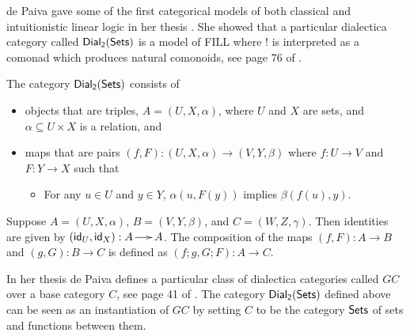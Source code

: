 de Paiva gave some of the first categorical models of both classical
and intuitionistic linear logic in her thesis \cite{dePaiva:1988}. She
showed that a particular dialectica category called $\mathsf{Dial_2}(\mathsf{Sets})$ is a model
of FILL where $!$ is interpreted as a comonad which produces natural
comonoids, see page 76 of \cite{dePaiva:1988}.
\begin{definition}
  \label{def:dial2sets}
  The category $\mathsf{Dial_2}(\mathsf{Sets})$ consists of 
  \begin{itemize}
  \item objects that are triples, $A = (U,X,\alpha)$, where $U$ and
    $X$ are sets, and $\alpha \subseteq U \times X$ is a relation, and
  \item maps that are pairs $(f,F) : (U,X,\alpha) \to (V,Y,\beta)$
    where $f : U \to V$ and $F : Y \to X$ such that
    \begin{itemize}
    \item For any $u \in U$ and $y \in Y$, $\alpha(u,F(y))$ implies $\beta(f(u),y)$.
    \end{itemize}
  \end{itemize}
  Suppose $A = (U,X,\alpha)$, $B = (V,Y,\beta)$, and
  $C = (W,Z,\gamma)$.  Then identities are given by
  $(\mathsf{id}_U,\mathsf{id}_X) : A \to A$.  The composition of the maps
  $(f,F) : A \to B$ and $(g, G) : B \to C$ is defined as
  $(f;g,G;F) : A \to C$.
\end{definition}
In her thesis de Paiva defines a particular class of dialectica
categories called $GC$ over a base category $C$, see page 41 of
\cite{dePaiva:1988}.  The category $\mathsf{Dial_2}(\mathsf{Sets})$
defined above can be seen as an instantiation of $GC$ by setting $C$
to be the category $\mathsf{Sets}$ of sets and functions between them.

